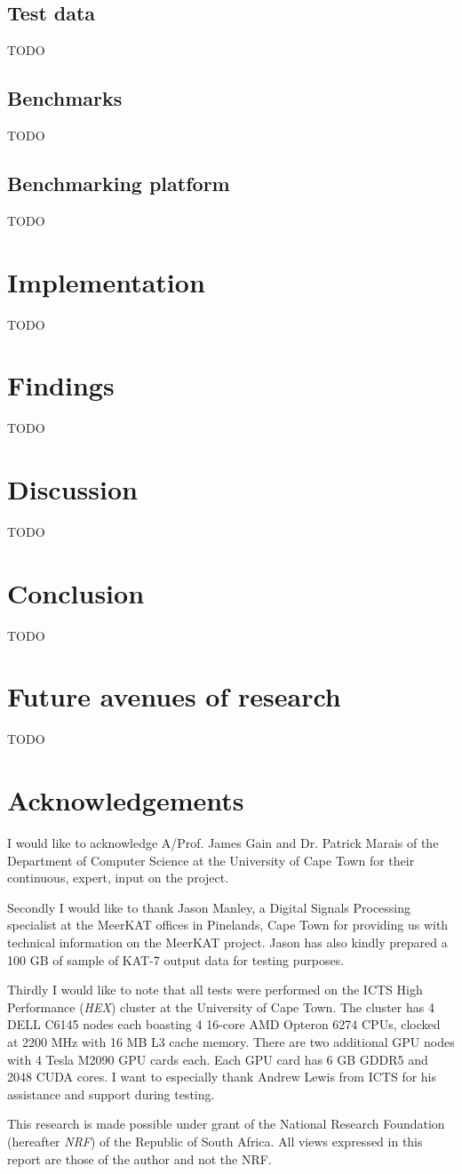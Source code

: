 \documentclass{acm_proc_article-sp}
\begin{document}
\subsection{Test data}
{\color{red}TODO}
\subsection{Benchmarks}
{\color{red}TODO}
\subsection{Benchmarking platform}
{\color{red}TODO}
\section{Implementation}
{\color{red}TODO}
\section{Findings}
{\color{red}TODO}
\section{Discussion}
{\color{red}TODO}
\section{Conclusion}
{\color{red}TODO}
\section{Future avenues of research}
{\color{red}TODO}
\section{Acknowledgements}
I would like to acknowledge A/Prof. James Gain and Dr. Patrick Marais of the Department of Computer Science at the University of Cape Town for their continuous, expert, input on the project.

Secondly I would like to thank Jason Manley, a Digital Signals Processing specialist at the MeerKAT offices in Pinelands, Cape Town for providing us with technical information
on the MeerKAT project. Jason has also kindly prepared a 100 GB of sample of KAT-7 output data for testing purposes.

Thirdly I would like to note that all tests were performed on the ICTS High Performance (\textit{HEX}) cluster at the University of Cape Town. The cluster has 4 DELL C6145 nodes each boasting 4 16-core
AMD Opteron 6274 CPUs, clocked at 2200 MHz with 16 MB L3 cache memory. There are two additional GPU nodes with 4 Tesla M2090 GPU cards each. Each GPU card has 6 GB GDDR5 and 2048 CUDA cores. I want to 
especially thank Andrew Lewis from ICTS for his assistance and support during testing.

This research is made possible under grant of the National Research Foundation (hereafter \textit{NRF}) of the Republic of South Africa. All views expressed in this report are those of the author and not the NRF.


\end{document}
